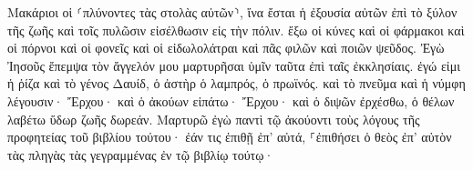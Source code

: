 \documentclass{openreader}
\begin{document}
Μακάριοι οἱ ⸂πλύνοντες τὰς στολὰς αὐτῶν⸃, ἵνα ἔσται ἡ ἐξουσία αὐτῶν ἐπὶ τὸ ξύλον τῆς ζωῆς καὶ τοῖς πυλῶσιν εἰσέλθωσιν εἰς τὴν πόλιν. 
ἔξω οἱ κύνες καὶ οἱ φάρμακοι καὶ οἱ πόρνοι καὶ οἱ φονεῖς καὶ οἱ εἰδωλολάτραι καὶ πᾶς φιλῶν καὶ ποιῶν ψεῦδος. 
Ἐγὼ Ἰησοῦς ἔπεμψα τὸν ἄγγελόν μου μαρτυρῆσαι ὑμῖν ταῦτα ἐπὶ ταῖς ἐκκλησίαις. ἐγώ εἰμι ἡ ῥίζα καὶ τὸ γένος Δαυίδ, ὁ ἀστὴρ ὁ λαμπρός, ὁ πρωϊνός. 
καὶ τὸ πνεῦμα καὶ ἡ νύμφη λέγουσιν· Ἔρχου· καὶ ὁ ἀκούων εἰπάτω· Ἔρχου· καὶ ὁ διψῶν ἐρχέσθω, ὁ θέλων λαβέτω ὕδωρ ζωῆς δωρεάν. 
Μαρτυρῶ ἐγὼ παντὶ τῷ ἀκούοντι τοὺς λόγους τῆς προφητείας τοῦ βιβλίου τούτου· ἐάν τις ἐπιθῇ ἐπ’ αὐτά, ⸀ἐπιθήσει ὁ θεὸς ἐπ’ αὐτὸν τὰς πληγὰς τὰς γεγραμμένας ἐν τῷ βιβλίῳ τούτῳ· 
\end{document}
